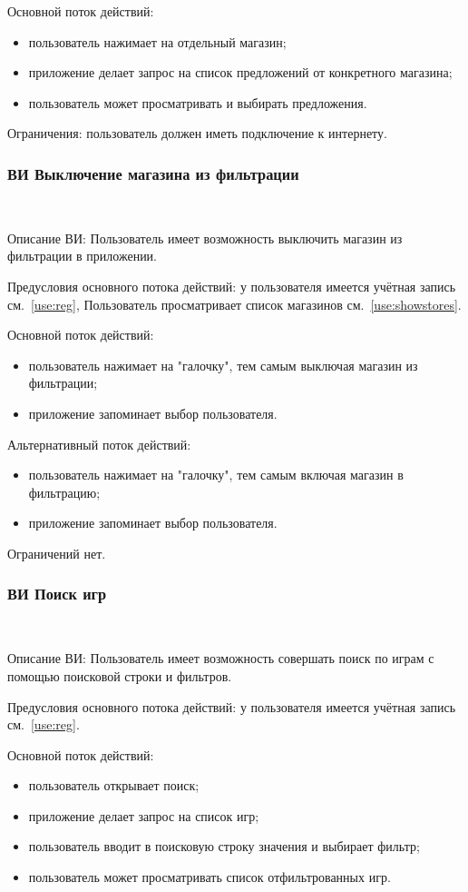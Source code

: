 Основной поток действий:
\begin{itemize}
   \item пользователь нажимает на отдельный магазин;
   \item приложение делает запрос на список предложений от конкретного магазина;
   \item пользователь может просматривать и выбирать предложения.
\end{itemize}
 
Ограничения: пользователь должен иметь подключение к интернету.

\subsubsection{ВИ Выключение магазина из фильтрации}~\par
Описание ВИ: Пользователь имеет возможность выключить магазин из фильтрации в приложении.
 
Предусловия основного потока действий: у пользователя имеется учётная запись см.~\ref{use:reg}, Пользователь просматривает список магазинов см.~\ref{use:showstores}.
 
Основной поток действий:
\begin{itemize}
   \item пользователь нажимает на "галочку", тем самым выключая магазин из фильтрации;
   \item приложение запоминает выбор пользователя.
\end{itemize}

Альтернативный поток действий:
\begin{itemize}
   \item пользователь нажимает на "галочку", тем самым включая магазин в фильтрацию;
   \item приложение запоминает выбор пользователя.
\end{itemize}
 
Ограничений нет.

\subsubsection{ВИ Поиск игр}~\par
\label{use:searchgames}
Описание ВИ: Пользователь имеет возможность совершать поиск по играм с помощью поисковой строки и фильтров.
 
Предусловия основного потока действий: у пользователя имеется учётная запись см.~\ref{use:reg}.
 
Основной поток действий:
\begin{itemize}
   \item пользователь открывает поиск;
   \item приложение делает запрос на список игр;
   \item пользователь вводит в поисковую строку значения и выбирает фильтр;
   \item пользователь может просматривать список отфильтрованных игр.
\end{itemize}
 
